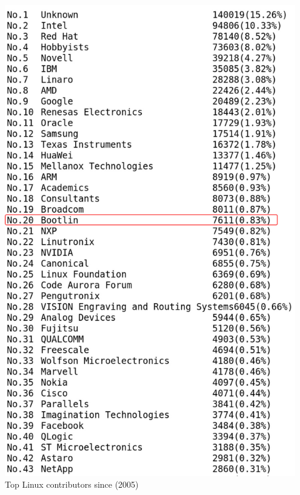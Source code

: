\begin{frame}
\begin{columns}
  \includegraphics[width=0.95\textwidth]{slides/about-us/bootlin-kernel-contribs.jpg}\\
  \tiny Top Linux contributors since  (2005)
  \end{columns}
\end{frame}

